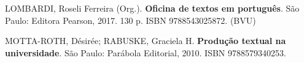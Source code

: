 \begin{pud}
\begin{bibcomplementar}
            \item LOMBARDI, Roseli Ferreira (Org.). \textbf{Oficina de textos em português}.  São Paulo: Editora Pearson, 2017. 130 p. ISBN 9788543025872. (BVU)
            \item MOTTA-ROTH, Désirée; RABUSKE, Graciela H. \textbf{Produção textual na universidade}. São Paulo: Parábola Editorial, 2010. ISBN 9788579340253.
	\end{bibcomplementar}

\end{pud}




